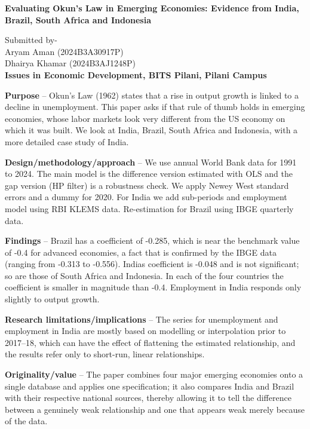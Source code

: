 \documentclass[12pt]{article}
\newcommand{\hone}[2]{\par\Needspace{4\baselineskip}\vspace{2pt}{\noindent\raggedright\bfseries
  \ifx\relax#1\relax\else\makebox[0.5in][l]{#1}\fi #2\par}\nopagebreak\vspace{-2pt}}
\begin{document}
\noindent
\begin{center}\bfseries Evaluating Okun’s Law in Emerging Economies: Evidence from India, Brazil, South Africa and Indonesia\end{center}

\begin{center}Submitted by-\\
Aryam Aman (2024B3A30917P)\\
Dhairya Khamar (2024B3AJ1248P)\\
\textbf{Issues in Economic Development, BITS Pilani, Pilani Campus}\end{center}

\hone{}{Abstract}

\textbf{Purpose} – Okun’s Law (1962) states that a rise in output growth is linked to a decline in unemployment. This paper asks if that rule of thumb holds in emerging economies, whose labor markets look very different from the US economy on which it was built. We look at India, Brazil, South Africa and Indonesia, with a more detailed case study of India.


\textbf{Design/methodology/approach} – We use annual World Bank data for 1991 to 2024. The main model is the difference version estimated with OLS and the gap version (HP filter) is a robustness check. We apply Newey West standard errors and a dummy for 2020. For India we add sub-periods and employment model using RBI KLEMS data. Re-estimation for Brazil using IBGE quarterly data.


\textbf{Findings} – Brazil has a coefficient of -0.285, which is near the benchmark value of -0.4 for advanced economies, a fact that is confirmed by the IBGE data (ranging from -0.313 to -0.556). India\textquotesingle{}s coefficient is -0.048 and is not significant; so are those of South Africa and Indonesia. In each of the four countries the coefficient is smaller in magnitude than -0.4. Employment in India responds only slightly to output growth.


\textbf{Research limitations/implications} – The series for unemployment and employment in India are mostly based on modelling or interpolation prior to 2017–18, which can have the effect of flattening the estimated relationship, and the results refer only to short-run, linear relationships.


\textbf{Originality/value} – The paper combines four major emerging economies onto a single database and applies one specification; it also compares India and Brazil with their respective national sources, thereby allowing it to tell the difference between a genuinely weak relationship and one that appears weak merely because of the data.
\end{document}
